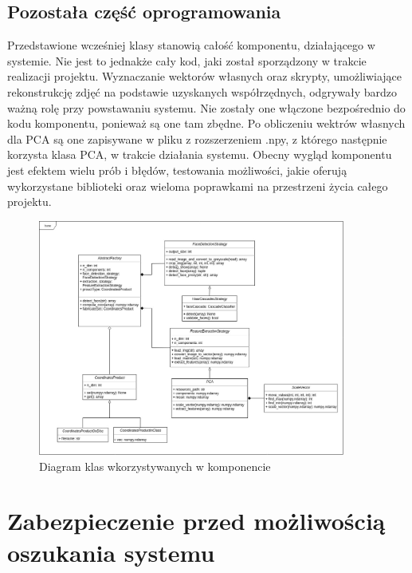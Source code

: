 \documentclass[oneside, eng]{mgr}
\begin{document}
\section{Pozostała część oprogramowania}
Przedstawione wcześniej klasy stanowią całość komponentu, działającego w systemie. Nie jest to jednakże cały kod, jaki został sporządzony w trakcie realizacji projektu. Wyznaczanie wektorów własnych oraz skrypty, umożliwiające rekonstrukcję zdjęć na podstawie uzyskanych współrzędnych, odgrywały bardzo ważną rolę przy powstawaniu systemu. Nie zostały one włączone bezpośrednio do kodu komponentu, ponieważ są one tam zbędne. Po obliczeniu wektrów własnych dla PCA są one zapisywane w pliku z rozszerzeniem .npy, z którego następnie korzysta klasa PCA, w trakcie działania systemu. Obecny wygląd komponentu jest efektem wielu prób i błędów, testowania możliwości, jakie oferują wykorzystane biblioteki oraz wieloma poprawkami na przestrzeni życia całego projektu.

\begin{figure}
\centering
	\includegraphics[width=0.90\textwidth]{Diagram.jpg}\par\vspace{1cm}
\caption{Diagram klas wkorzystywanych w komponencie}
	\label{fig:diagram_klas}
\end{figure}


\newpage

\chapter{Zabezpieczenie przed możliwością oszukania systemu}
\end{document}
